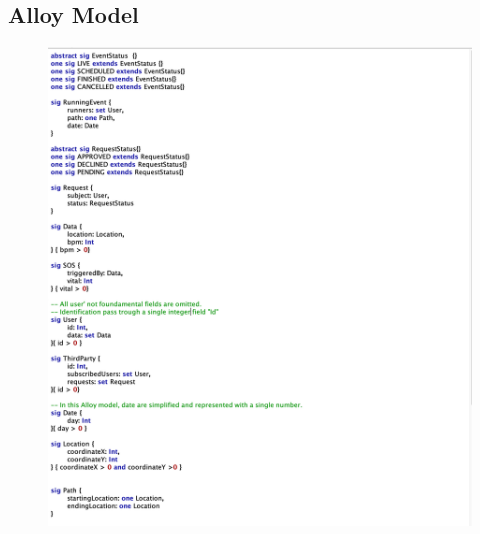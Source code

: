 \documentclass{article}
\begin{document}
\subsection{Alloy Model}
\begin{figure}[h!]
  \includegraphics[width=\textwidth]{Figures/Alloy1}
\end{figure}
\newpage
\end{document}
